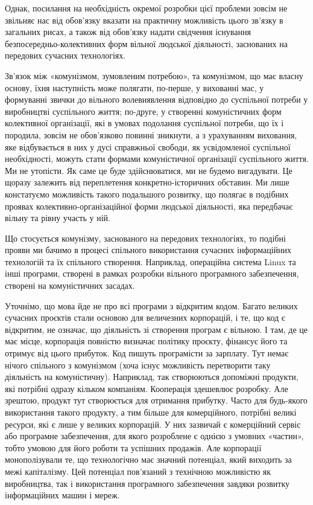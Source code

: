 \documentclass[12pt,a4paper,openany]{book}
\begin{document}
Однак, посилання на необхідність окремої розробки цієї проблеми зовсім не звільняє нас від обов’язку вказати на практичну можливість цього зв’язку в загальних рисах, а також від обов’язку надати свідчення існування безпосередньо-колективних форм вільної людської діяльності, заснованих на передових сучасних технологіях.

Зв’язок між «комунізмом, зумовленим потребою», та комунізмом, що має власну основу, їхня наступність може полягати, по-перше, у вихованні мас, у формуванні звички до вільного волевиявлення відповідно до суспільної потреби у виробництві суспільного життя; по-друге, у створенні комуністичних форм колективної організації, які в умовах подолання суспільної потреби, що їх і породила, зовсім не обов’язково повинні зникнути, а з урахуванням виховання, яке відбувається в них у дусі справжньої свободи, як усвідомленої суспільної необхідності, можуть стати формами комуністичної організації суспільного життя. Ми не утопісти. Як саме це буде здійснюватися, ми не будемо вигадувати. Це щоразу залежить від переплетення конкретно-історичних обставин. Ми лише констатуємо можливість такого подальшого розвитку, що полягає в подібних проявах колективно-організаційної форми людської діяльності, яка передбачає вільну та рівну участь у ній.

Що стосується комунізму, заснованого на передових технологіях, то подібні прояви ми бачимо в процесі спільного використання сучасних інформаційних технологій та їх спільного створення. Наприклад, операційна система Linux та інші програми, створені в рамках розробки вільного програмного забезпечення, створені на комуністичних засадах.

Уточнімо, що мова йде не про всі програми з відкритим кодом. Багато великих сучасних проєктів стали основою для величезних корпорацій, і те, що код є відкритим, не означає, що діяльність зі створення програм є вільною. І там, де це має місце, корпорація повністю визначає політику проєкту, фінансує його та отримує від цього прибуток. Код пишуть програмісти за зарплату. Тут немає нічого спільного з комунізмом (хоча існує можливість перетворити таку діяльність на комуністичну). Наприклад, так створюються допоміжні продукти, які потрібні одразу кільком компаніям. Кооперація здешевлює розробку. Але зрештою, продукт тут створюється для отримання прибутку. Часто для будь-якого використання такого продукту, а тим більше для комерційного, потрібні великі ресурси, які є лише у великих корпорацій. У них зазвичай є комерційний сервіс або програмне забезпечення, для якого розроблене є однією з умовних «частин», тобто умовою для його роботи та успішних продажів. Але корпорації монополізували те, що технологічно має значний потенціал, який виходить за межі капіталізму. Цей потенціал пов’язаний з технічною можливістю як виробництва, так і використання програмного забезпечення завдяки розвитку інформаційних машин і мереж.
\end{document}
